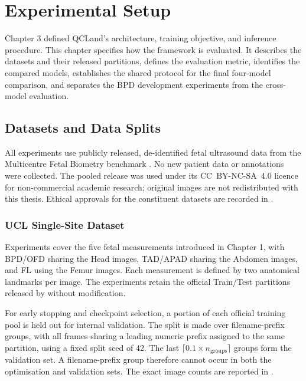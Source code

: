 \chapter{Experimental Setup}
\label{chap:experimental-setup}

Chapter 3 defined QCLand's architecture, training objective, and
inference procedure. This chapter specifies how the framework is
evaluated. It describes the datasets and their released partitions,
defines the evaluation metric, identifies the compared models,
establishes the shared protocol for the final four-model comparison,
and separates the BPD development experiments from the cross-model
evaluation.



\section{Datasets and Data Splits}
\label{sec:setup-datasets}

All experiments use publicly released, de-identified fetal ultrasound
data from the Multicentre Fetal Biometry benchmark
\parencite{divece2025multicentre}. No new patient data or annotations
were collected. The pooled release was used under its CC~BY-NC-SA~4.0
licence for non-commercial academic research; original images are not
redistributed with this thesis. Ethical approvals for the constituent
datasets are recorded in .


\subsection{UCL Single-Site Dataset}
\label{sec:setup-ucl}

Experiments cover the five fetal measurements introduced in
Chapter 1, with BPD/OFD sharing the Head images, TAD/APAD sharing
the Abdomen images, and FL using the Femur images. Each measurement
is defined by two anatomical landmarks per image. The experiments
retain the official Train/Test partitions released by
\textcite{divece2025multicentre} without modification.

For early stopping and checkpoint selection, a portion of each
official training pool is held out for internal validation. The split
is made over filename-prefix groups, with all frames sharing a leading
numeric prefix assigned to the same partition, using a fixed split
seed of 42. The last
$\lceil 0.1 \times n_{\text{groups}}\rceil$ groups form the
validation set. A filename-prefix group therefore cannot occur in
both the optimisation and validation sets. The exact image counts are
reported in .


